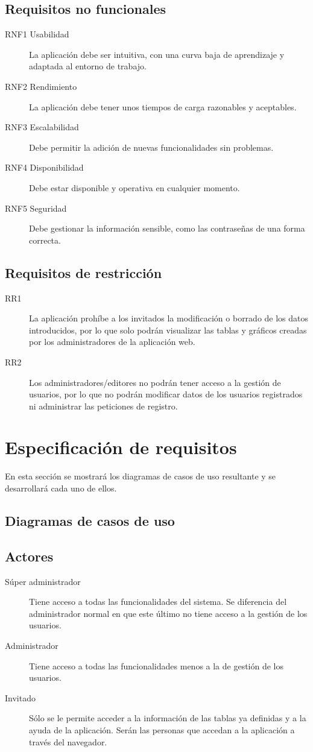 \subsection{Requisitos no funcionales}
\begin{description}
    \item[RNF1 Usabilidad] La aplicación debe ser intuitiva, con una curva baja de aprendizaje y adaptada al entorno de trabajo.
    \item[RNF2 Rendimiento] La aplicación debe tener unos tiempos de carga razonables y aceptables.
    \item[RNF3 Escalabilidad] Debe permitir la adición de nuevas funcionalidades sin problemas.
    \item[RNF4 Disponibilidad] Debe estar disponible y operativa en cualquier momento.
    \item[RNF5 Seguridad] Debe gestionar la información sensible, como las contraseñas de una forma correcta.
\end{description}
\subsection{Requisitos de restricción}
\begin{description}
    \item[RR1]  La aplicación prohíbe a los invitados la modificación o borrado de los datos introducidos, por lo que solo podrán visualizar las tablas y gráficos creadas por los administradores de la aplicación web.
    \item[RR2] Los administradores/editores no podrán tener acceso a la gestión de usuarios, por lo que no podrán modificar datos de los usuarios registrados ni administrar las peticiones de registro.
\end{description}
\section{Especificación de requisitos}
En esta sección se mostrará los diagramas de casos de uso resultante y se desarrollará cada uno de ellos.
\subsection{Diagramas de casos de uso}
\subsection{Actores}
\begin{description}
    \item [Súper administrador] Tiene acceso a todas las funcionalidades del sistema. Se diferencia del administrador normal en que este último no tiene acceso a la gestión de los usuarios.
    \item [Administrador] Tiene acceso a todas las funcionalidades menos a la de gestión de los usuarios.
    \item [Invitado] Sólo se le permite acceder a la información de las tablas ya definidas y a la ayuda de la aplicación. Serán las personas que accedan a la aplicación a través del navegador.
\end{description}
